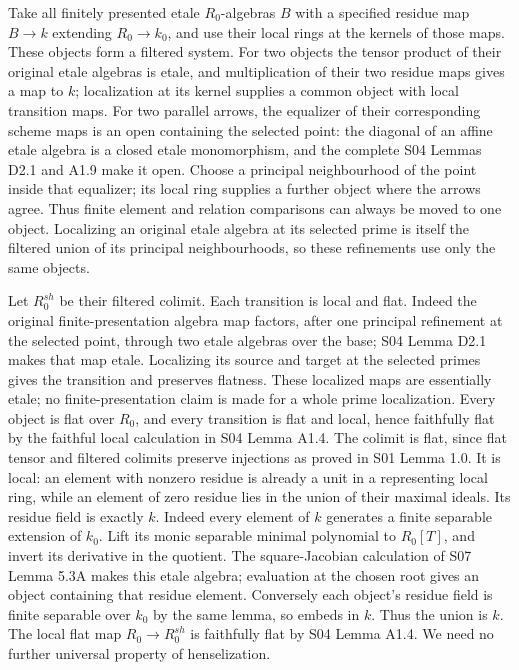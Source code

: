 \documentclass[11pt,a4paper,openany]{report}
\begin{document}
Take all finitely presented etale \(R_0\)-algebras \(B\) with a specified residue map \(B\to k\) extending \(R_0\to k_0\), and use their local rings at the kernels of those maps. These objects form a filtered system. For two objects the tensor product of their original etale algebras is etale, and multiplication of their two residue maps gives a map to \(k\); localization at its kernel supplies a common object with local transition maps. For two parallel arrows, the equalizer of their corresponding scheme maps is an open containing the selected point: the diagonal of an affine etale algebra is a closed etale monomorphism, and the complete S04 Lemmas D2.1 and A1.9 make it open. Choose a principal neighbourhood of the point inside that equalizer; its local ring supplies a further object where the arrows agree. Thus finite element and relation comparisons can always be moved to one object. Localizing an original etale algebra at its selected prime is itself the filtered union of its principal neighbourhoods, so these refinements use only the same objects.

Let \(R_0^{sh}\) be their filtered colimit. Each transition is local and flat. Indeed the original finite-presentation algebra map factors, after one principal refinement at the selected point, through two etale algebras over the base; S04 Lemma D2.1 makes that map etale. Localizing its source and target at the selected primes gives the transition and preserves flatness. These localized maps are essentially etale; no finite-presentation claim is made for a whole prime localization. Every object is flat over \(R_0\), and every transition is flat and local, hence faithfully flat by the faithful local calculation in S04 Lemma A1.4. The colimit is flat, since flat tensor and filtered colimits preserve injections as proved in S01 Lemma 1.0. It is local: an element with nonzero residue is already a unit in a representing local ring, while an element of zero residue lies in the union of their maximal ideals. Its residue field is exactly \(k\). Indeed every element of \(k\) generates a finite separable extension of \(k_0\). Lift its monic separable minimal polynomial to \(R_0[T]\), and invert its derivative in the quotient. The square-Jacobian calculation of S07 Lemma 5.3A makes this etale algebra; evaluation at the chosen root gives an object containing that residue element. Conversely each object's residue field is finite separable over \(k_0\) by the same lemma, so embeds in \(k\). Thus the union is \(k\). The local flat map \(R_0\to R_0^{sh}\) is faithfully flat by S04 Lemma A1.4. We need no further universal property of henselization.
\end{document}
